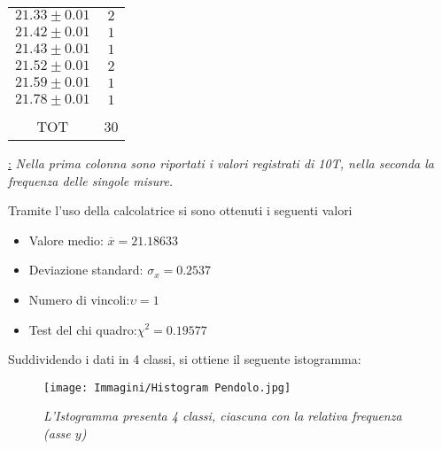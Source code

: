 \documentclass[12pt, a4paper]{article}
\begin{document}
\begin{table}[!htb]
\begin{minipage}[t]{.3\linewidth}
\begin{tabular}{|c|c|}
            
            $21.33\pm 0.01$ & $2$\\
            $21.42\pm 0.01$ & $1$\\
            $21.43\pm 0.01$ & $1$\\
            $21.52\pm 0.01$ & $2$\\
            $21.59\pm 0.01$ & $1$\\
            $21.78\pm 0.01$ & $1$\\
            &\\
            \hline
            \hline
            TOT & 30\\
            \hline
        \end{tabular}
        \label{TAB:1}
    \end{minipage} 
\end{table}
\begin{center}
   \href{Tabella 1} : \textit{\footnotesize{Nella prima colonna sono riportati i valori registrati di 10T,
         nella seconda la frequenza delle singole misure.}}
\end{center}


\addvspace{3cm}

Tramite l'uso della calcolatrice si sono ottenuti i seguenti valori\begin{itemize}

\bigskip

    \item\phantom{asd} Valore medio:\phantom{aaaaaaaaa.aaaaa}
          $\overline{x}=21.18633$
\\
      
    \item\phantom{asd} Deviazione standard:\phantom{aaaaaaaa}
        $\sigma_x=0.2537$
\\

     \item\phantom{asd} Numero di vincoli:\phantom{aaaaaaaaaaa}$\upsilon=1$
\\

 \item\phantom{asd} Test del chi quadro:\phantom{aaaaaaaaaa}$\chi^2=0.19577$
    
    
\end{itemize}

\newpage

Suddividendo i dati in 4 classi, si ottiene il seguente istogramma:

    \begin{figure}[h!]
\centering
\texttt{[image: Immagini/Histogram Pendolo.jpg]}
\caption{\textit{{\footnotesize{L'Istogramma presenta 4 classi, ciascuna con la relativa frequenza (asse $y$) }}}}
\label{Grafico parabolico}
\end{figure}
\end{document}
